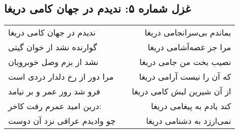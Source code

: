 \begin{center}
\section*{غزل شماره ۵: ندیدم در جهان کامی دریغا}
\label{sec:005}
\begin{longtable}{l p{0.5cm} r}
ندیدم در جهان کامی دریغا
&&
بماندم بی‌سرانجامی دریغا
\\
گوارنده نشد از خوان گیتی
&&
مرا جز غصه‌آشامی دریغا
\\
نشد از بزم وصل خوبرویان
&&
نصیب بخت من جامی دریغا
\\
مرا دور از رخ دلدار دردی است
&&
که آن را نیست آرامی دریغا
\\
فرو شد روز عمر و بر نیامد
&&
از آن شیرین لبش کامی دریغا
\\
درین امید عمرم رفت کاخر:
&&
کند یادم به پیغامی دریغا
\\
چو وادیدم عراقی نزد آن دوست
&&
نمی‌ارزد به دشنامی دریغا
\\
\end{longtable}
\end{center}
